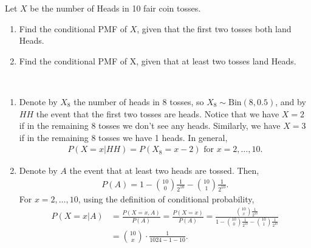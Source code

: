 
\setcounter{theorem}{10}
\begin{exercise}[BH.3.24]
  Let $X$ be the number of Heads in 10 fair coin tosses.
	\begin{enumerate}
		\item Find the conditional PMF of $X$, given that the first two tosses both land Heads. 
		\item Find the conditional PMF of X, given that at least two tosses land Heads.
	\end{enumerate}
\begin{solution}~
	\begin{enumerate}
	    \item Denote by $X_{8}$ the number of heads in $8$ tosses, so $X_{8}\sim \text{Bin}(8,0.5)$, and by $HH$ the event that the first two tosses are heads. Notice that we have $X=2$ if in the remaining 8 tosses we don't see any heads. Similarly, we have $X=3$ if in the remaining 8 tosses we have 1 heads. In general, 
        \begin{align*}
        	P(X=x|HH) = P(X_{8}=x-2) \text{  for } x=2,\ldots,10.
        \end{align*}
        \item Denote by $A$ the event that at least two heads are tossed. Then,
        \begin{align*}
        	P(A) = 1-{10 \choose 0}\frac{1}{2^{10}}-{10 \choose 1}\frac{1}{2^{10}}.
        \end{align*} For $x=2,\ldots,10$, using the definition of conditional probability,
        \begin{align*}
        	P(X=x|A) &=\frac{P(X=x,A)}{P(A)} = \frac{P(X=x)}{P(A)} = \frac{{10 \choose x}\frac{1}{2^{10}}}{1-{10 \choose 0}\frac{1}{2^{10}}-{10 \choose 1}\frac{1}{2^{10}}}\\
        	&={10 \choose x}\cdot \frac{1}{1024-1-10}.
        \end{align*}
	\end{enumerate}
\end{solution}
\end{exercise}


